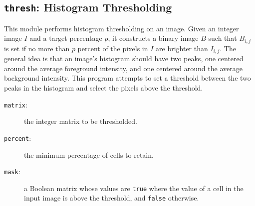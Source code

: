 \subsection{{\tt{thresh}}: Histogram Thresholding\label{s:toys-thresh}}

This module performs histogram thresholding on an image.
Given an integer image $I$ and a target percentage $p$,
it constructs a binary image $B$
such that $B_{i,j}$ is set
if no more than $p$ percent of the pixels in $I$ are brighter than $I_{i,j}$.
The general idea is that an image's histogram should have two peaks,
one centered around the average foreground intensity,
and one centered around the average background intensity.
This program attempts to set
a threshold between the two peaks in the histogram
and select the pixels above the threshold.

{}

\begin{description}
\item[{\tt{matrix}}:]
	the integer matrix to be thresholded.
\item[{\tt{percent}}:]
	the minimum percentage of cells to retain.
\end{description}

{\outputspec}

\begin{description}
\item[{\tt{mask}}:]
	a Boolean matrix whose values are {\tt{true}} where the value of a cell in the input image is above the threshold,
	and {\tt{false}} otherwise.
\end{description}
